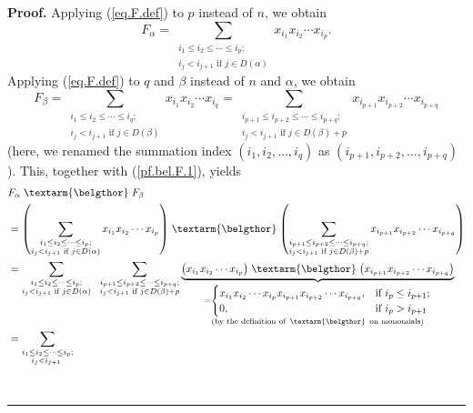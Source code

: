 \documentclass
[numbers=enddot,12pt,final,onecolumn,notitlepage,abstracton]{scrartcl}%
\theoremstyle{definition}
\newenvironment{proof}[1][Proof]{\noindent\textbf{#1.} }{\ \rule{0.5em}{0.5em}}
\newcommand{\bel}{\left. \textarm{\belgthor} \right.}
\let\sumnonlimits\sum
\renewcommand{\sum}{\sumnonlimits\limits}
\begin{document}
\begin{proof}
Applying (\ref{eq.F.def}) to $p$ instead of $n$, we obtain%
\begin{equation}
F_{\alpha}=\sum_{\substack{i_{1}\leq i_{2}\leq\cdots\leq i_{p};\\i_{j}%
<i_{j+1}\text{ if }j\in D\left(  \alpha\right)  }}x_{i_{1}}x_{i_{2}}\cdots
x_{i_{p}}. \label{pf.bel.F.1}%
\end{equation}
Applying (\ref{eq.F.def}) to $q$ and $\beta$ instead of $n$ and $\alpha$, we
obtain%
\[
F_{\beta}=\sum_{\substack{i_{1}\leq i_{2}\leq\cdots\leq i_{q};\\i_{j}%
<i_{j+1}\text{ if }j\in D\left(  \beta\right)  }}x_{i_{1}}x_{i_{2}}\cdots
x_{i_{q}}=\sum_{\substack{i_{p+1}\leq i_{p+2}\leq\cdots\leq i_{p+q}%
;\\i_{j}<i_{j+1}\text{ if }j\in D\left(  \beta\right)  +p}}x_{i_{p+1}%
}x_{i_{p+2}}\cdots x_{i_{p+q}}%
\]
(here, we renamed the summation index $\left(  i_{1},i_{2},\ldots
,i_{q}\right)  $ as $\left(  i_{p+1},i_{p+2},\ldots,i_{p+q}\right)  $). This,
together with (\ref{pf.bel.F.1}), yields%
\begin{align}
&  F_{\alpha}\bel F_{\beta}\nonumber\\
&  =\left(  \sum_{\substack{i_{1}\leq i_{2}\leq\cdots\leq i_{p};\\i_{j}%
<i_{j+1}\text{ if }j\in D\left(  \alpha\right)  }}x_{i_{1}}x_{i_{2}}\cdots
x_{i_{p}}\right)  \bel\left(  \sum_{\substack{i_{p+1}\leq i_{p+2}\leq
\cdots\leq i_{p+q};\\i_{j}<i_{j+1}\text{ if }j\in D\left(  \beta\right)
+p}}x_{i_{p+1}}x_{i_{p+2}}\cdots x_{i_{p+q}}\right) \nonumber\\
&  =\sum_{\substack{i_{1}\leq i_{2}\leq\cdots\leq i_{p};\\i_{j}<i_{j+1}\text{
if }j\in D\left(  \alpha\right)  }}\ \ \sum_{\substack{i_{p+1}\leq i_{p+2}%
\leq\cdots\leq i_{p+q};\\i_{j}<i_{j+1}\text{ if }j\in D\left(  \beta\right)
+p}}\underbrace{\left(  x_{i_{1}}x_{i_{2}}\cdots x_{i_{p}}\right)  \bel\left(
x_{i_{p+1}}x_{i_{p+2}}\cdots x_{i_{p+q}}\right)  }_{\substack{=%
\begin{cases}
x_{i_{1}}x_{i_{2}}\cdots x_{i_{p}}x_{i_{p+1}}x_{i_{p+2}}\cdots x_{i_{p+q}}, &
\text{if }i_{p}\leq i_{p+1};\\
0, & \text{if }i_{p}>i_{p+1}%
\end{cases}
\\\text{(by the definition of }\bel\text{ on monomials)}}}\nonumber\\
&  =\sum_{\substack{i_{1}\leq i_{2}\leq\cdots\leq i_{p};\\i_{j}<i_{j+1}\text{
}}}
\end{align}
\end{proof}
\end{document}
